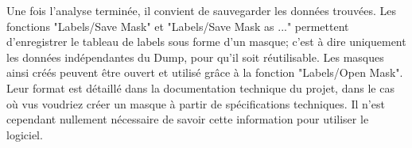  Une fois l'analyse terminée, il convient de sauvegarder les données trouvées. Les fonctions "Labels/Save Mask" et "Labels/Save Mask as ..." permettent d'enregistrer le tableau de labels sous forme d'un masque; c'est à dire uniquement les données indépendantes du Dump, pour qu'il soit réutilisable.
 Les masques ainsi créés peuvent être ouvert et utilisé grâce à la fonction "Labels/Open Mask". Leur format est détaillé dans la documentation technique du projet, dans le cas où vus voudriez créer un masque à partir de spécifications techniques. Il n'est cependant nullement nécessaire de savoir cette information pour utiliser le logiciel.